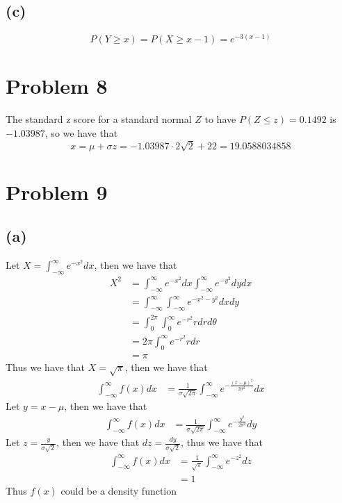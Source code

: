 \subsection*{(c)}
$$P(Y\geq x)=P(X\geq x-1)=\boxed{e^{-3(x-1)}}$$
\section*{Problem 8}
The standard z score for a standard normal $Z$ to have 
$P(Z\leq z)=0.1492$ is $-1.03987$, so we have that
$$x=\mu+\sigma z=-1.03987\cdot2\sqrt{2}+22=\boxed{19.0588034858}$$
\section*{Problem 9}
\subsection*{(a)}
Let $X=\int_{-\infty}^{\infty}e^{-x^2}dx$, then we have that
\begin{align*}
    X^2&=\int_{-\infty}^{\infty}e^{-x^2}dx\int_{-\infty}^{\infty}e^{-y^2}dydx\\
    &=\int_{-\infty}^{\infty}\int_{-\infty}^{\infty}e^{-x^2-y^2}dxdy\\
    &=\int_{0}^{2\pi}\int_{0}^{\infty}e^{-r^2}rdrd\theta\\
    &=2\pi\int_{0}^{\infty}e^{-r^2}rdr\\
    &=\pi
\end{align*}
Thus we have that $X=\sqrt{\pi}$, then we have that 
\begin{align}
    \int_{-\infty}^{\infty}f(x)dx&=\frac{1}{\sigma\sqrt{2\pi}}\int_{-\infty}^{\infty}e^{-\frac{(x-\mu)^2}{2\sigma^2}}dx
\end{align}
Let $y=x-\mu$, then we have that
\begin{align*}
    \int_{-\infty}^{\infty}f(x)dx&=\frac{1}{\sigma\sqrt{2\pi}}\int_{-\infty}^{\infty}e^{-\frac{y^2}{2\sigma^2}}dy
\end{align*}
Let $z=\frac{y}{\sigma\sqrt{2}}$, then we have that $dz=\frac{dy}{\sigma\sqrt{2}}$,
thus we have that 
\begin{align*}
    \int_{-\infty}^{\infty}f(x)dx&=\frac{1}{\sqrt{\pi}}\int_{-\infty}^{\infty}e^{-z^2}dz\\
    &=1
\end{align*}
Thus $f(x)$ could be a density function
